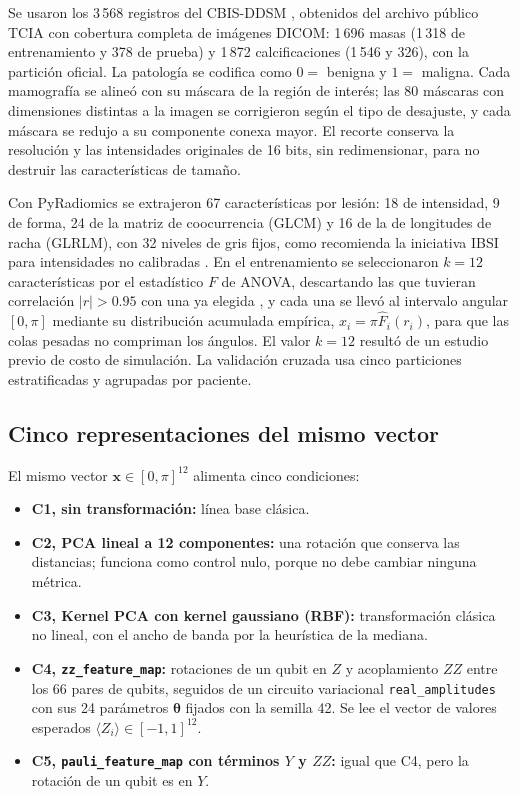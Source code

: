 \documentclass[conference,letterpaper]{IEEEtran}
\begin{document}
Se usaron los 3\,568 registros del CBIS-DDSM \cite{Lee2017CBISDDSM}, obtenidos del archivo público TCIA con cobertura completa de imágenes DICOM: 1\,696 masas (1\,318 de entrenamiento y 378 de prueba) y 1\,872 calcificaciones (1\,546 y 326), con la partición oficial. La patología se codifica como $0 = $ benigna y $1 = $ maligna. Cada mamografía se alineó con su máscara de la región de interés; las 80 máscaras con dimensiones distintas a la imagen se corrigieron según el tipo de desajuste, y cada máscara se redujo a su componente conexa mayor. El recorte conserva la resolución y las intensidades originales de 16 bits, sin redimensionar, para no destruir las características de tamaño.

Con PyRadiomics \cite{vanGriethuysen2017} se extrajeron 67 características por lesión: 18 de intensidad, 9 de forma, 24 de la matriz de coocurrencia (GLCM) y 16 de la de longitudes de racha (GLRLM), con 32 niveles de gris fijos, como recomienda la iniciativa IBSI para intensidades no calibradas \cite{Zwanenburg2020IBSI}. En el entrenamiento se seleccionaron $k = 12$ características por el estadístico $F$ de ANOVA, descartando las que tuvieran correlación $|r| > 0.95$ con una ya elegida \cite{Guyon2003}, y cada una se llevó al intervalo angular $[0,\pi]$ mediante su distribución acumulada empírica, $x_i = \pi \hat{F}_i(r_i)$, para que las colas pesadas no compriman los ángulos. El valor $k = 12$ resultó de un estudio previo de costo de simulación. La validación cruzada usa cinco particiones estratificadas y agrupadas por paciente.

\subsection{Cinco representaciones del mismo vector}

El mismo vector $\mathbf{x} \in [0,\pi]^{12}$ alimenta cinco condiciones:
\begin{itemize}
  \item \textbf{C1, sin transformación:} línea base clásica.
  \item \textbf{C2, PCA lineal a 12 componentes:} una rotación que conserva las distancias; funciona como control nulo, porque no debe cambiar ninguna métrica.
  \item \textbf{C3, Kernel PCA con kernel gaussiano (RBF):} transformación clásica no lineal, con el ancho de banda por la heurística de la mediana.
  \item \textbf{C4, \texttt{zz\_\allowbreak feature\_\allowbreak map}:} rotaciones de un qubit en $Z$ y acoplamiento $ZZ$ entre los 66 pares de qubits, seguidos de un circuito variacional \texttt{real\_\allowbreak amplitudes} con sus 24 parámetros $\boldsymbol{\theta}$ fijados con la semilla 42. Se lee el vector de valores esperados $\langle Z_i \rangle \in [-1,1]^{12}$.
  \item \textbf{C5, \texttt{pauli\_\allowbreak feature\_\allowbreak map} con términos $Y$ y $ZZ$:} igual que C4, pero la rotación de un qubit es en $Y$.
\end{itemize}
\end{document}
